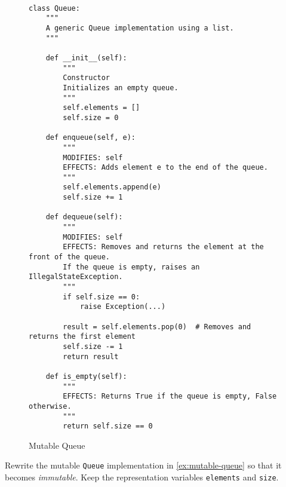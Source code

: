 \documentclass[oneside,11pt,dvipsnames]{book}
\newcommand{\code}[1]{\texttt{#1}}
\begin{document}
\begin{figure}
    \begin{lstlisting}

class Queue:
    """
    A generic Queue implementation using a list.
    """

    def __init__(self):
        """
        Constructor
        Initializes an empty queue.
        """
        self.elements = []
        self.size = 0

    def enqueue(self, e):
        """
        MODIFIES: self
        EFFECTS: Adds element e to the end of the queue.
        """
        self.elements.append(e)
        self.size += 1

    def dequeue(self):
        """
        MODIFIES: self
        EFFECTS: Removes and returns the element at the front of the queue.
        If the queue is empty, raises an IllegalStateException.
        """
        if self.size == 0:
            raise Exception(...)

        result = self.elements.pop(0)  # Removes and returns the first element
        self.size -= 1
        return result

    def is_empty(self):
        """
        EFFECTS: Returns True if the queue is empty, False otherwise.
        """
        return self.size == 0

    \end{lstlisting}
    \caption{Mutable Queue}\label{ex:mutable-queue}
\end{figure}

Rewrite the mutable \code{Queue} implementation in \autoref{ex:mutable-queue} so that it becomes \emph{immutable}. Keep the representation variables \code{elements} and \code{size}.





\end{document}
